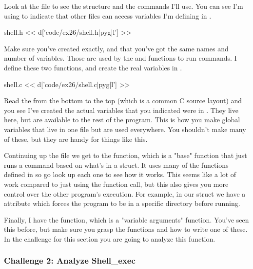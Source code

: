 Look at the  file to see the structure and the commands I'll use.
You can see I'm using  to indicate that other  files
can access variables I'm defining in .

\begin{code}{shell.h}
<< d['code/ex26/shell.h|pyg|l'] >>
\end{code}

Make sure you've created  exactly, and that you've got the
same names and number of  variables.  Those are used
by the  and  functions to run commands.
I define these two functions, and create the real variables in .

\begin{code}{shell.c}
<< d['code/ex26/shell.c|pyg|l'] >>
\end{code}

Read the  from the bottom to the top (which is a common C source
layout) and you see I've created the actual  variables that you
indicated were  in .  They live here, but are 
available to the rest of the program.  This is how you make global variables
that live in one  file but are used everywhere.  You shouldn't make
many of these, but they are handy for things like this.

Continuing up the file we get to the  function, which is
a "base" function that just runs a command based on what's in a 
struct.  It uses many of the functions defined in 
so go look up each one to see how it works.  This seems like a lot of work
compared to just using the  function call, but this also gives
you more control over the other program's execution.  For example, in our
 struct we have a  attribute which forces the program
to be in a specific directory before running.

Finally, I have the  function, which is a "variable arguments"
function.  You've seen this before, but make sure you grasp the 
functions and how to write one of these.  In the challenge for this section
you are going to analyze this function.

\subsubsection{Challenge 2: Analyze Shell\_exec}

